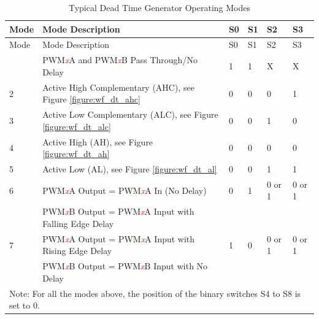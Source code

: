 \begin{longtable}[c]{ |p{1cm}|p{10cm}|p{1cm}|p{1cm}|p{1cm}|p{1cm}|}
    \caption{Typical Dead Time Generator Operating Modes}
    \label{table:mod_dt}
    \\\hline
    \rowcolor{lightgray}
    Mode
    & Mode Description
    & S0
    & S1
    & S2
    & S3
    \\\hline
    \endfirsthead
    \hline
    \rowcolor{lightgray}   
    Mode
    & Mode Description
    & S0
    & S1
    & S2
    & S3
    \\\hline
    \endhead
    \hline
    \endfoot
    1
    & PWM\textcolor{red}{\it{x}}A and PWM\textcolor{red}{\it{x}}B Pass Through/No Delay
    & 1
    & 1
    & X
    & X
    \\\hline
    2
    & Active High Complementary (AHC), see Figure \ref{figure:wf_dt_ahc}
    & 0
    & 0
    & 0
    & 1
    \\\hline
    3
    & Active Low Complementary (ALC), see Figure \ref{figure:wf_dt_alc}
    & 0
    & 0
    & 1
    & 0
    \\\hline
    4
    & Active High (AH), see Figure \ref{figure:wf_dt_ah}
    & 0
    & 0
    & 0
    & 0
    \\\hline
    5
    & Active Low (AL), see Figure \ref{figure:wf_dt_al}
    & 0
    & 0
    & 1
    & 1
    \\\hline
    6
    & PWM\textcolor{red}{\it{x}}A Output = PWM\textcolor{red}{\it{x}}A In (No Delay)
    & 0
    & 1
    & 0 or 1
    & 0 or 1 \\
    & PWM\textcolor{red}{\it{x}}B Output = PWM\textcolor{red}{\it{x}}A Input with Falling Edge Delay &&&&
    \\\hline
    7
    & PWM\textcolor{red}{\it{x}}A Output = PWM\textcolor{red}{\it{x}}A Input with Rising Edge Delay
    & 1
    & 0
    & 0 or 1
    & 0 or 1\\
    & PWM\textcolor{red}{\it{x}}B Output = PWM\textcolor{red}{\it{x}}B Input with No Delay &&&&
    \\\hline
    \multicolumn{6}{|l|}{Note: For all the modes above, the position of the binary switches S4 to S8 is set to 0.}
\end{longtable}